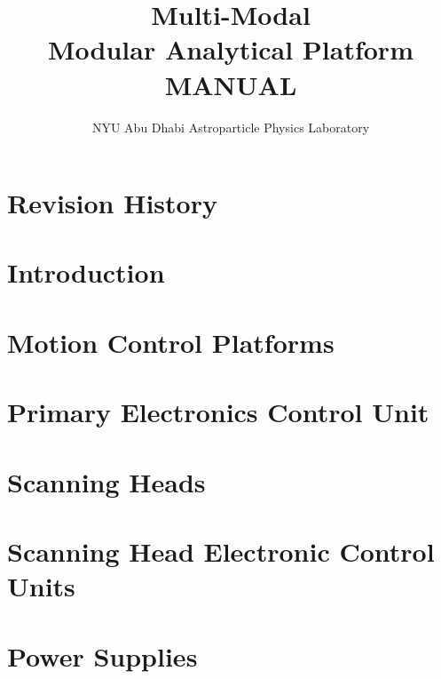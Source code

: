 \documentclass{ol-softwaremanual}
\title{Multi-Modal \\ Modular Analytical Platform \\ MANUAL}
\author{NYU Abu Dhabi Astroparticle Physics Laboratory}
\begin{document}
\maketitle

\tableofcontents

\newpage
\section{Revision History}


\newpage
\section{Introduction}


\newpage
\section{Motion Control Platforms}


\newpage
\section{Primary Electronics Control Unit}


\newpage
\section{Scanning Heads}


\newpage
\section{Scanning Head Electronic Control Units}



\newpage
\section{Power Supplies}
\end{document}
